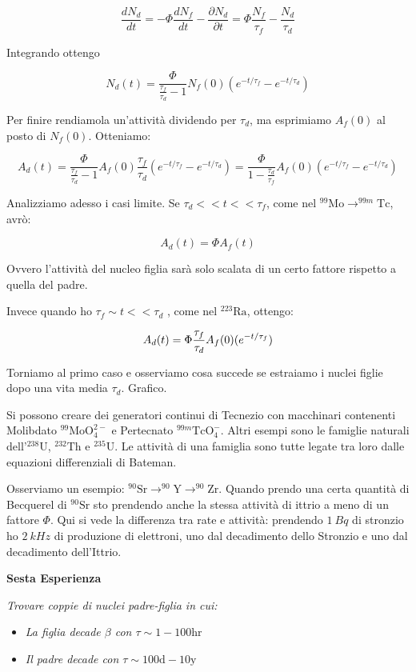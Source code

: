 \begin{equation}
\frac{dN_d}{dt}=-\Phi \frac{dN_f}{dt} - \frac{\partial N_d}{\partial t} = \Phi \frac{N_f}{\tau_f} - \frac{N_d}{\tau_d}
\end{equation}

Integrando ottengo

\begin{equation}
N_d(t)=\frac{\Phi}{\frac{\tau_f}{\tau_d}-1}N_f(0)(e^{-t/\tau_f}-e^{-t/\tau_d})
\end{equation}

Per finire rendiamola un'attività dividendo per $\tau_d$, ma esprimiamo $A_f(0)$ al posto di $N_f(0)$. Otteniamo:

\begin{equation}
A_d(t)=\frac{\Phi}{\frac{\tau_f}{\tau_d}-1}A_f(0)\frac{\tau_f}{\tau_d}(e^{-t/\tau_f}-e^{-t/\tau_d}) =\frac{\Phi}{1-\frac{\tau_d}{\tau_f}}A_f(0)(e^{-t/\tau_f}-e^{-t/\tau_d})
\end{equation}

Analizziamo adesso i casi limite. Se $\tau_d << t << \tau_f$, come nel $^{99}\text{Mo} \rightarrow ^{99m}\text{Tc}$, avrò:

\begin{equation}
A_d(t)=\Phi A_f(t)
\end{equation}

Ovvero l'attività del nucleo figlia sarà solo scalata di un certo fattore rispetto a quella del padre.

Invece quando ho $\tau_f \sim t << \tau_d$ , come nel $^{223}\text{Ra}$, ottengo:

\begin{equation}
A_d(t)=\Phi \frac{\tau_f}{\tau_d}A_f(0)(\-e^{-t/\tau_f})
\end{equation}

Torniamo al primo caso e osserviamo cosa succede se estraiamo i nuclei figlie dopo una vita media $\tau_d$. Grafico.

Si possono creare dei generatori continui di Tecnezio con macchinari contenenti Molibdato $^{99}\text{MoO}_4^{2-}$ e Pertecnato $^{99m}\text{TcO}_4^-$.
Altri esempi sono le famiglie naturali dell'$^{238}\text{U}$, $^{232}\text{Th}$ e $^{235}\text{U}$.  Le attività di una famiglia sono tutte legate tra loro dalle equazioni differenziali di Bateman.

Osserviamo un esempio: $^{90}\text{Sr} \rightarrow ^{90}\text{Y} \rightarrow ^{90}\text{Zr}$. Quando prendo una certa quantità di Becquerel di $^{90}\text{Sr}$ sto prendendo anche la stessa attività di ittrio a meno di un fattore $\Phi$. Qui si vede la differenza tra rate e attività: prendendo $1 \ Bq$ di stronzio ho $2 \ kHz$ di produzione di elettroni, uno dal decadimento dello Stronzio e uno dal decadimento dell'Ittrio. 

\textbf{Sesta Esperienza}

\emph{Trovare coppie di nuclei padre-figlia in cui:}
\begin{itemize}
\item \emph{La figlia decade $\beta$ con $\tau\sim1-100\text{hr}$}
\item \emph{Il padre decade con $\tau\sim100\text{d}-10\text{y}$}
\end{itemize}

